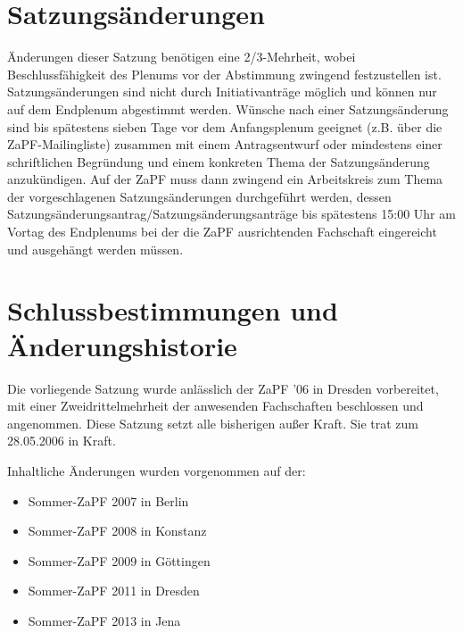 \documentclass[draft,12pt,oneside]{scrreprt}
\begin{document}
\section{Satzungsänderungen}
Änderungen dieser Satzung benötigen eine 2/3-Mehrheit, wobei Beschlussfähigkeit
des Plenums vor der Abstimmung zwingend festzustellen ist. Satzungsänderungen
sind nicht durch Initiativanträge möglich und können nur auf dem Endplenum
abgestimmt werden. Wünsche nach einer Satzungsänderung sind bis spätestens
sieben Tage vor dem Anfangsplenum geeignet (z.B. über die ZaPF-Mailingliste)
zusammen mit einem Antragsentwurf oder mindestens einer schriftlichen
Begründung und einem konkreten Thema der Satzungsänderung anzukündigen. Auf der
ZaPF muss dann zwingend ein Arbeitskreis zum Thema der vorgeschlagenen
Satzungsänderungen durchgeführt werden, dessen
Satzungsänderungsantrag/Satzungsänderungsanträge bis spätestens 15:00 Uhr am
Vortag des Endplenums bei der die ZaPF ausrichtenden Fachschaft eingereicht und
ausgehängt werden müssen.

\section*{Schlussbestimmungen und Änderungshistorie}
Die vorliegende Satzung wurde anlässlich der ZaPF '06 in Dresden vorbereitet,
mit einer Zweidrittelmehrheit der anwesenden Fachschaften beschlossen und
angenommen. Diese Satzung setzt alle bisherigen außer Kraft. Sie trat zum
28.05.2006 in Kraft.

Inhaltliche Änderungen wurden vorgenommen auf der:

\begin{itemize}

  \item Sommer-ZaPF 2007 in Berlin

  \item Sommer-ZaPF 2008 in Konstanz

  \item Sommer-ZaPF 2009 in Göttingen

  \item Sommer-ZaPF 2011 in Dresden

  \item Sommer-ZaPF 2013 in Jena

\end{itemize}
\end{document}
